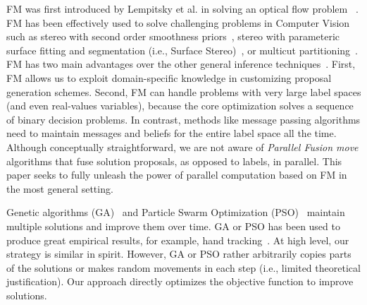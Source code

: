 
\noindent FM was first introduced by Lempitsky et al. in solving an
optical flow problem~\cite{first_fusion_viktor} . FM has been effectively
used to solve challenging problems in Computer Vision such as stereo
with second order smoothness priors~\cite{woodford}, stereo
with parameteric surface fitting and segmentation (i.e., Surface
Stereo)~\cite{surface_stereo}, or multicut
partitioning~\cite{fusionmovesforcorrelationclustering}.
%
FM has two main advantages over the other general inference
techniques~\cite{trw,loopy_belief_propagation}. First, FM allows us to
exploit domain-specific knowledge in customizing proposal generation
schemes. Second, FM can handle problems with very large label spaces
(and even real-values variables), because the core optimization
solves a sequence of binary decision problems.
%
In contrast, methods like message passing algorithms need to maintain
messages and beliefs for the entire label space all the time.
%
Although conceptually straightforward, we are not aware of {\it Parallel
Fusion move} algorithms that fuse solution proposals, as opposed to
labels, in parallel. This paper seeks to fully unleash the power of
parallel computation based on FM in the most general setting.



\noindent
Genetic algorithms (GA)~\cite{ga} and Particle Swarm
Optimization (PSO)~\cite{pso} maintain multiple solutions and improve
them over time.
%
GA or PSO has been used to produce great empirical results, for example,
hand tracking~\cite{pushmeet_hand_tracking}.
%
At high level, our strategy is similar in spirit. However, GA or PSO
rather arbitrarily copies parts of the solutions or makes random movements
in each step (i.e., limited theoretical justification).
%
Our approach directly optimizes the objective function to improve
solutions.


